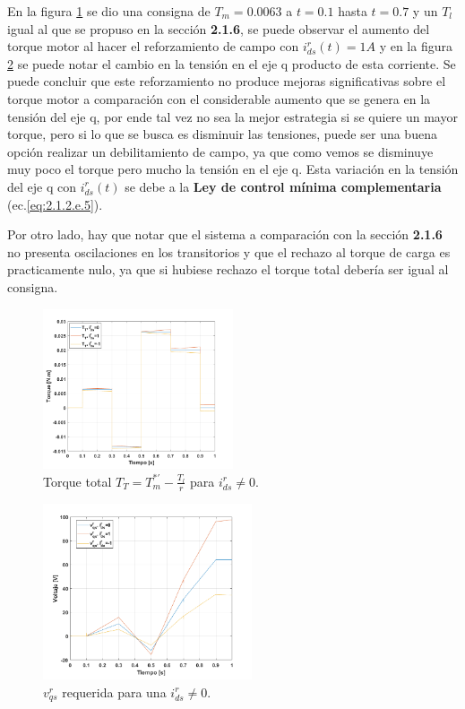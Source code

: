 \documentclass[10pt]{article}
\begin{document}
\begin{itemize}
	En la figura \ref{fig:TTmodulador_id} se dio una consigna de $T_{m}=0.0063$ a $t=0.1$ hasta $t=0.7$ y un $T_{l}$ igual al que se propuso en la sección \textbf{2.1.6}, se puede observar el aumento del torque motor al hacer el reforzamiento de campo con $i^{r}_{ds}(t)=1 A$ y en la figura \ref{fig:vqmodulador_id} se puede notar el cambio en la tensión en el eje q producto de esta corriente. Se puede concluir que este reforzamiento no produce mejoras significativas sobre el torque motor a comparación con el considerable aumento que se genera en la tensión del eje q, por ende tal vez no sea la mejor estrategia si se quiere un mayor torque, pero si lo que se busca es disminuir las tensiones, puede ser una buena opción realizar un debilitamiento de campo, ya que como vemos se disminuye muy poco el torque pero mucho la tensión en el eje q. Esta variación en la tensión del eje q con $i^{r}_{ds}(t)$  se debe a la \textbf{Ley de control mínima complementaria} (ec.\ref{eq:2.1.2.e.5}).
	
	Por otro lado, hay que notar que el sistema a comparación con la sección \textbf{2.1.6} no presenta oscilaciones en los transitorios y que el rechazo al torque de carga es practicamente nulo, ya que si hubiese rechazo el torque total debería ser igual al consigna. 
	 	\begin{figure}[h!]
	\centering
	\includegraphics[width=0.5\textwidth]{TTmodulador_id.png}
	\caption{\label{fig:TTmodulador_id}Torque total $T_{T}=T^{*'}_{m}-\frac{T_{l}}{r}$ para $i^{r}_{ds}\neq0$.}
	\end{figure}
		 	\begin{figure}[h!]
	\centering
	\includegraphics[width=0.55\textwidth]{Tmodulador_id.png}
	\caption{\label{fig:vqmodulador_id}$v^{r}_{qs}$ requerida para una $i^{r}_{ds}\neq0$.}
	\end{figure}
\end{itemize}
\end{document}
